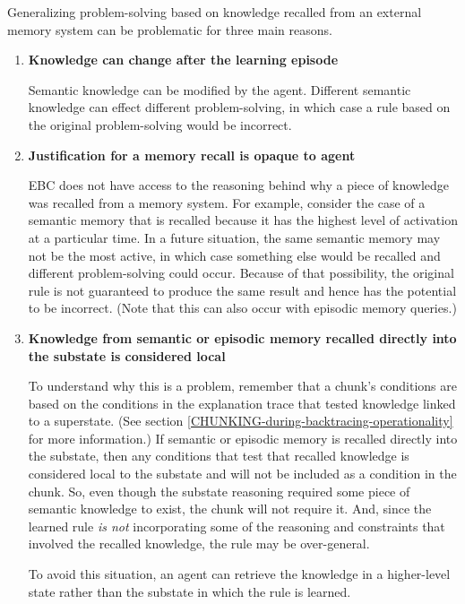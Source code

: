 Generalizing problem-solving based on knowledge recalled from an external memory system can be problematic for three main reasons.

\begin{enumerate}
	\item \textbf{Knowledge can change after the learning episode} \hfill
	
	Semantic knowledge can be modified by the agent.  Different semantic knowledge can effect different problem-solving, in which case a rule based on the original problem-solving would be incorrect. 

	\item \textbf{Justification for a memory recall is opaque to agent} \hfill 
	
	EBC does not have access to the reasoning behind why a piece of knowledge was recalled from a memory system.  For example, consider the case of a semantic memory that is recalled because it has the highest level of activation at a particular time.  In a future situation, the same semantic memory may not be the most active, in which case something else would be recalled and different problem-solving could occur.  Because of that possibility, the original rule is not guaranteed to produce the same result and hence has the potential to be incorrect.  (Note that this can also occur with episodic memory queries.)

	\item \textbf{Knowledge from semantic or episodic memory recalled directly into the substate is considered local} \hfill
	
	To understand why this is a problem, remember that a chunk's conditions are based on the conditions in the explanation trace that tested knowledge linked to a superstate.  (See section \ref{CHUNKING-during-backtracing-operationality} for more information.) If semantic or episodic memory is recalled directly into the substate, then any conditions that test that recalled knowledge is considered local to the substate and will not be included as a condition in the chunk.  So, even though the substate reasoning required some piece of semantic knowledge to exist, the chunk will not require it.  And, since the learned rule \textit{is not} incorporating some of the reasoning and constraints that involved the recalled knowledge, the rule may be over-general.

	To avoid this situation, an agent can retrieve the knowledge in a higher-level state rather than the substate in which the rule is learned.
\end{enumerate}

